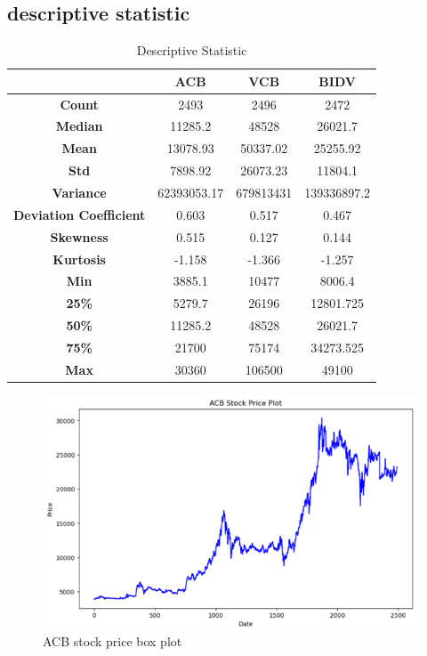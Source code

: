 \documentclass{ieeeojies}
\begin{document}
\subsection{descriptive statistic}
\begin{table}[H]
    \centering
    \begin{tabular}{|c|c|c|c|}
    \hline
     & \cellcolor{blue!10}\textbf{ACB} & \cellcolor{blue!10}\textbf{VCB} & \cellcolor{blue!10}\textbf{BIDV} \\
    \hline
    \cellcolor{blue!10}\textbf{Count}  & 2493 & 2496 & 2472\\ 
    \hline
    \cellcolor{blue!10}\textbf{Median}  & 11285.2 & 48528 & 26021.7\\
    \hline
    \cellcolor{blue!10}\textbf{Mean} & 13078.93 & 50337.02 & 25255.92\\
    \hline
    \cellcolor{blue!10}\textbf{Std}   & 7898.92 &26073.23  & 11804.1\\
    \hline
    \cellcolor{blue!10}\textbf{Variance}  & 62393053.17 & 679813431 &139336897.2 \\
    \hline
    \cellcolor{blue!10}\textbf{Deviation Coefficient}    & 0.603 & 0.517 & 0.467\\
    \hline
    \cellcolor{blue!10}\textbf{Skewness}   & 0.515 & 0.127 & 0.144\\
    \hline
    \cellcolor{blue!10}\textbf{Kurtosis}  & -1.158 & -1.366 & -1.257\\
    \hline
    \cellcolor{blue!10}\textbf{Min}   & 3885.1 & 10477 & 8006.4\\
    \hline
    \cellcolor{blue!10}\textbf{25\%}   & 5279.7 & 26196 & 12801.725\\
    \hline
    \cellcolor{blue!10}\textbf{50\%}   & 11285.2 & 48528 & 26021.7\\
    \hline
    \cellcolor{blue!10}\textbf{75\%}   & 21700 & 75174 & 34273.525\\
    \hline
    \cellcolor{blue!10}\textbf{Max}  & 30360 & 106500 & 49100\\
     \hline
    \end{tabular}
    \caption{Descriptive Statistic}
    \label{Descriptive Statistics}
\end{table}
\begin{figure}[H]
    \centering
    \includegraphics[width=1\linewidth]{ACB_plot.png}
    \caption{ACB stock price box plot}
    \label{fig:enter-label}
\end{figure}
\end{document}
